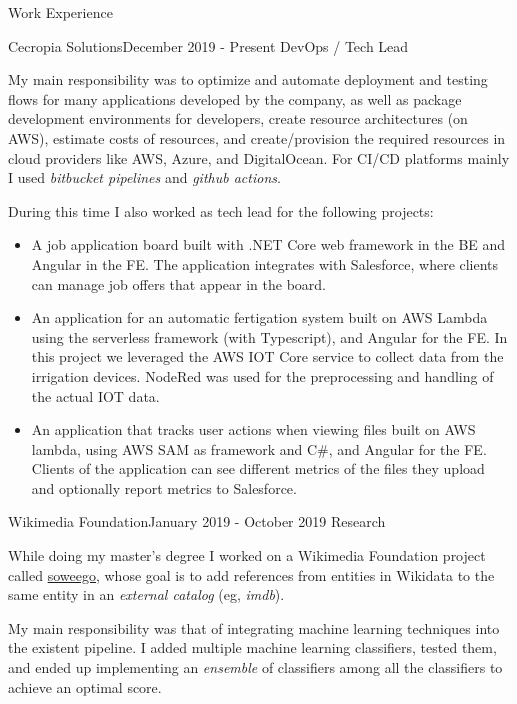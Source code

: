 \documentclass{resume} %
\begin{document}
\begin{rSection}{Work Experience}


\begin{rSubsection}{Cecropia Solutions}{December 2019 - Present}
{DevOps / Tech Lead}{}
\item[] My main responsibility was to optimize and automate deployment and testing flows for many applications developed by the company, as well as package development environments for developers, create resource architectures (on AWS), estimate costs of resources, and create/provision the required resources in cloud providers like AWS, Azure, and DigitalOcean. For CI/CD platforms mainly I used \textit{bitbucket pipelines} and \textit{github actions}. 

During this time I also worked as tech lead for the following projects: 

\begin{itemize}
    \item A job application board built with .NET Core web framework in the BE and Angular in the FE. The application integrates with Salesforce, where clients can manage job offers that appear in the board. 
    \item An application for an automatic fertigation system built on AWS Lambda using the serverless framework (with Typescript), and Angular for the FE. In this project we leveraged the AWS IOT Core service to collect data from the irrigation devices. NodeRed was used for the preprocessing and handling of the actual IOT data.
    \item An application that tracks user actions when viewing files built on AWS lambda, using AWS SAM as framework and C\#, and Angular for the FE. Clients of the application can see different metrics of the files they upload and optionally report metrics to Salesforce. 
\end{itemize}
\end{rSubsection}

\begin{rSubsection}{Wikimedia Foundation}{January 2019 - October 2019}
{Research}{}
\item[] While doing my master's degree I worked on a Wikimedia Foundation project called \href{https://meta.wikimedia.org/wiki/Grants:Project/Hjfocs/soweego}{soweego}, whose goal is to add references from entities in Wikidata to the same entity in an \textit{external catalog} (eg, \textit{imdb}).

My main responsibility was that of integrating machine learning techniques into the existent pipeline. I added multiple machine learning classifiers, tested them, and ended up implementing an \textit{ensemble} of classifiers among all the classifiers to achieve an optimal score.
\end{rSubsection}


\end{rSection}
\end{document}
